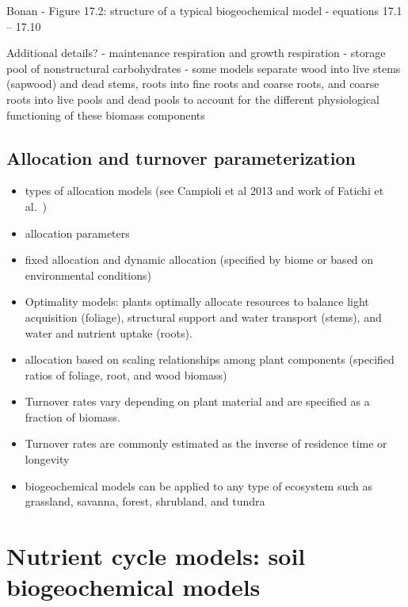 \documentclass[
  oneside]{book}
\begin{document}
Bonan
- Figure 17.2: structure of a typical biogeochemical model
- equations 17.1 -- 17.10

Additional details?
- maintenance respiration and growth respiration
- storage pool of nonstructural carbohydrates
- some models separate wood into live stems (sapwood) and dead stems, roots into fine roots and coarse roots, and coarse roots into live pools and dead pools to account for the different physiological functioning of these biomass components

\hypertarget{allocation-and-turnover-parameterization}{%
\subsection{Allocation and turnover parameterization}\label{allocation-and-turnover-parameterization}}

\begin{itemize}
\item
  types of allocation models (see Campioli et al 2013 and work of Fatichi et al.~)
\item
  allocation parameters
\item
  fixed allocation and dynamic allocation (specified by biome or based on environmental conditions)
\item
  Optimality models: plants optimally allocate resources to balance light acquisition (foliage), structural support and water transport (stems), and water and nutrient uptake (roots).
\item
  allocation based on scaling relationships among plant components (specified ratios of foliage, root, and wood biomass)
\item
  Turnover rates vary depending on plant material and are specified as a fraction of biomass.
\item
  Turnover rates are commonly estimated as the inverse of residence time or longevity
\item
  biogeochemical models can be applied to any type of ecosystem such as grassland, savanna, forest, shrubland, and tundra
\end{itemize}

\hypertarget{nutrient-cycle-models-soil-biogeochemical-models}{%
\section{Nutrient cycle models: soil biogeochemical models}\label{nutrient-cycle-models-soil-biogeochemical-models}}
\end{document}

